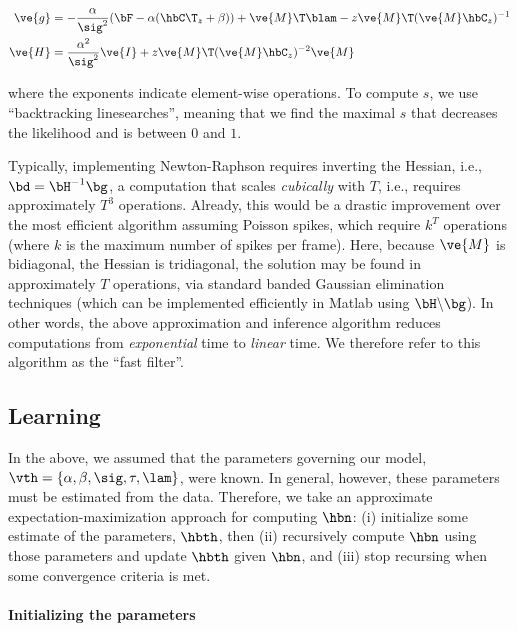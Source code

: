 \begin{subequations} \label{eq:NR}
\begin{align}
\ve{g} &= -\frac{\alpha}{\sig^2}(\bF -\alpha({\hbC\T}_{\zzz} + \beta)) + \ve{M}\T\blam - \zzz \ve{M}\T (\ve{M} \hbC_{\zzz})^{-1} \label{eq:g} \\
\ve{H} &= \frac{\alpha^2}{\sig^2} \ve{I} + \zzz \ve{M}\T (\ve{M} \hbC_{\zzz})^{-2} \ve{M} \label{eq:H}
\end{align}
\end{subequations}

\noindent where the exponents indicate element-wise operations. To compute $s$, we use ``backtracking linesearches'', meaning that we find the maximal $s$ that decreases the likelihood and is between $0$ and $1$.

Typically, implementing Newton-Raphson requires inverting the Hessian, i.e., $\bd = \bH^{-1} \bg$, a computation that scales \emph{cubically} with $T$, i.e., requires approximately $T^3$ operations. Already, this would be a drastic improvement over the most efficient algorithm assuming Poisson spikes, which require $k^T$ operations (where $k$ is the maximum number of spikes per frame).  Here, because $\ve{M}$ is bidiagonal, the Hessian is tridiagonal, the solution may be found in approximately $T$ operations, via standard banded Gaussian elimination techniques (which can be implemented efficiently in Matlab using $\bH \backslash \bg$). In other words, the above approximation and inference algorithm reduces computations from \emph{exponential} time to \emph{linear} time. We therefore refer to this algorithm as the ``fast filter''.





\subsection{Learning} \label{sec:learn}

In the above, we assumed that the parameters governing our model, $\vth=\{\alpha, \beta, \sig, \tau, \lam\}$, were known. In general, however, these parameters must be estimated from the data. Therefore, we take an approximate expectation-maximization approach for computing $\hbn$: (i) initialize some estimate of the parameters, $\hbth$, then (ii) recursively compute $\hbn$ using those parameters and update $\hbth$ given $\hbn$, and (iii) stop recursing when some convergence criteria is met.  

\paragraph{Initializing the parameters}

